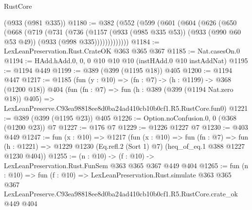 \begin{lexlean}{RustCore}
\begin{coremodule}
    (@933 (@981 @335))
@1180 := @382
    (@552
      (@599
        (@601
          (@604
            (@626
              (@650
                (@668
                  (@719
                    (@731
                      (@736
                        (@1157
                          (@933 (@985 @335 @53))
                          (@933 (@990 @60 @53 @49))
                          (@933 (@998 @335)))))))))))))
@1184 := LexLeanPreservation.Rust.CrateOK @363 @365 @367
@1185 := Nat.casesOn.{0}
@1194 := HAdd.hAdd.{0, 0, 0} @10 @10 @10 (instHAdd.{0} @10 instAddNat)
@1195 := @1194 @449
@1199 := @389 (@399 (@1195 @18)) @405
@1200 := @1194 @447
@1217 := @1185
    (fun (y : @10) => (fn : @7) -> (h : @1199) -> @368 (@1200 @18))
    @404
    (fun (fn : @7) =>
    fun (h : @389 (@399 (@1194 Nat.zero @18)) @405) =>
    LexLeanPreserve.C93ea98818ee8d0ba24ad410cb10b0cf1.R5.RustCore.fun0)
@1221 := @389 (@399 (@1195 @23)) @405
@1226 := Option.noConfusion.{0, 0} (@368 (@1200 @23)) @7
@1227 := @176 @7
@1229 := @1226 @1227 @7
@1230 := @403 @449
@1247 := fun (x : @10) =>
  @1217
    (fun (x : @10) =>
    fun (fn : @7) =>
    fun (h : @1221) => @1229 @1230 (Eq.refl.{2} (Sort 1) @7) (heq_of_eq.{1} @388 @1227 @1230 @404))
@1255 := (n : @10) -> (f : @10) -> LexLeanPreservation.Rust.FunSem @363 @365 @367 @449 @404
@1265 := fun (n : @10) =>
  fun (f : @10) =>
  LexLeanPreservation.Rust.simulate
    @363
    @365
    @367
    LexLeanPreserve.C93ea98818ee8d0ba24ad410cb10b0cf1.R5.RustCore.crate_ok
    @449
    @404
\end{coremodule}
\end{lexlean}
